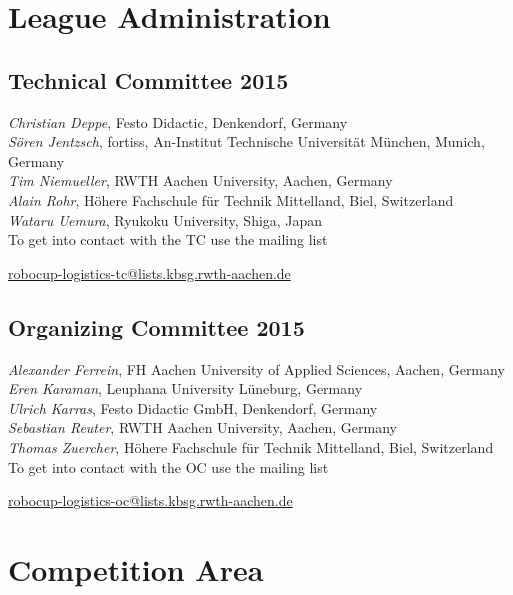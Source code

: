 \documentclass[12pt,twoside]{article}
\begin{document}
\section{League Administration} \label{sec:commitees}
\subsection{Technical Committee 2015} \label{sec:tc}
\emph{Christian Deppe}, Festo Didactic, Denkendorf, Germany\\
\emph{S\"oren Jentzsch}, fortiss, An-Institut Technische Universit\"at M\"unchen, Munich, Germany\\
\emph{Tim Niemueller}, RWTH Aachen University, Aachen, Germany\\
\emph{Alain Rohr}, H\"ohere Fachschule für Technik Mittelland, Biel, Switzerland\\
\emph{Wataru Uemura}, Ryukoku University, Shiga, Japan\\

\noindent
To get into contact with the TC use the mailing list\\
\centerline{\url{robocup-logistics-tc@lists.kbsg.rwth-aachen.de}}

\subsection{Organizing Committee 2015} \label{sec:oc} 
\emph{Alexander Ferrein}, FH Aachen University of Applied Sciences,
Aachen, Germany\\
\emph{Eren Karaman}, Leuphana University L\"uneburg, Germany\\
\emph{Ulrich Karras}, Festo Didactic GmbH, Denkendorf, Germany\\
\emph{Sebastian Reuter}, RWTH Aachen University, Aachen, Germany\\
\emph{Thomas Zuercher}, H\"ohere Fachschule für Technik Mittelland, Biel, Switzerland\\

\noindent
To get into contact with the OC use the mailing list\\
\centerline{\url{robocup-logistics-oc@lists.kbsg.rwth-aachen.de}}


\section{Competition Area} \label{sec:area}
\end{document}
